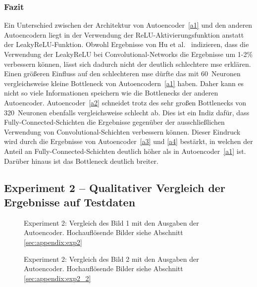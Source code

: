 \subsubsection*{Fazit}

Ein Unterschied zwischen der Architektur von Autoencoder~\ref{a1} und den anderen Autoencodern liegt in der Verwendung der ReLU-Aktivierungsfunktion anstatt der LeakyReLU-Funktion. Obwohl Ergebnisse von Hu et al.~\cite{huImprovingConvolutionalNeural2018} indizieren, dass die Verwendung der LeakyReLU bei Convolutional-Networks die Ergebnisse um 1-2\% verbessern können, lässt sich dadurch nicht der deutlich schlechtere \gls{mse} erklären. Einen größeren Einfluss auf den schlechteren \gls{mse} dürfte das mit 60~Neuronen vergleichsweise kleine Bottleneck von Autoencodern~\ref{a1} haben. Daher kann es nicht so viele Informationen speichern wie die Bottlenecks der anderen Autoencoder. Autoencoder~\ref{a2} schneidet trotz des sehr großen Bottlenecks von 320~Neuronen ebenfalls vergleichsweise schlecht ab. Dies ist ein Indiz dafür, dass Fully-Connected-Schichten die Ergebnisse gegenüber der ausschließlichen Verwendung von Convolutional-Schichten verbessern können. Dieser Eindruck wird durch die Ergebnisse von Autoencoder~\ref{a3} und \ref{a4} bestärkt, in welchen der Anteil an Fully-Connected-Schichten deutlich höher als in Autoencoder~\ref{a1} ist. Darüber hinaus ist das Bottleneck deutlich breiter.

\subsection{Experiment 2 -- Qualitativer Vergleich der Ergebnisse auf Testdaten}
\label{subsec:exp2}


\begin{figure}[htbp]
    \centering
    \resizebox*{!}{.98\textheight}{}
    \caption{Experiment 2: Vergleich des Bild 1 mit den Ausgaben der Autoencoder. Hochauflösende Bilder siehe Abschnitt \ref{sec:appendix:exp2}}
    \label{exp2_image:1}
\end{figure}

\begin{figure}[htbp]
    \centering
    \resizebox*{!}{.98\textheight}{}
    \caption{Experiment 2: Vergleich des Bild 2 mit den Ausgaben der Autoencoder. Hochauflösende Bilder siehe Abschnitt \ref{sec:appendix:exp2_2}}
    \label{exp2_image:2}
\end{figure}

